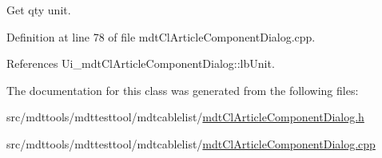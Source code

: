 Get qty unit. 



Definition at line 78 of file mdt\-Cl\-Article\-Component\-Dialog.\-cpp.



References Ui\-\_\-mdt\-Cl\-Article\-Component\-Dialog\-::lb\-Unit.



The documentation for this class was generated from the following files\-:\begin{DoxyCompactItemize}
\item 
src/mdttools/mdttesttool/mdtcablelist/\hyperlink{mdt_cl_article_component_dialog_8h}{mdt\-Cl\-Article\-Component\-Dialog.\-h}\item 
src/mdttools/mdttesttool/mdtcablelist/\hyperlink{mdt_cl_article_component_dialog_8cpp}{mdt\-Cl\-Article\-Component\-Dialog.\-cpp}\end{DoxyCompactItemize}
